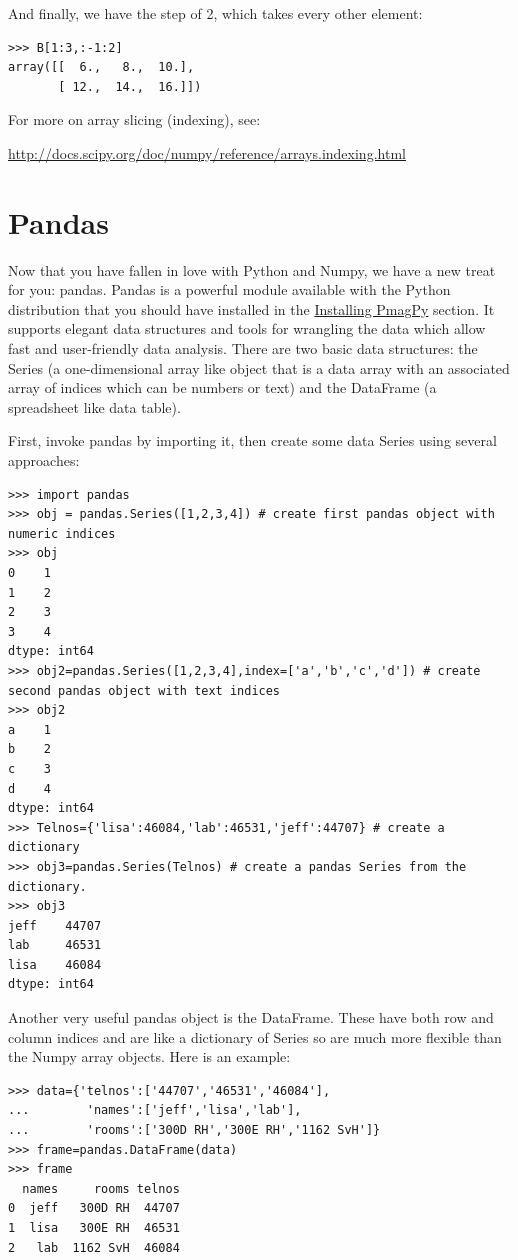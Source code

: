 \documentclass[11pt]{book}
\begin{document}
{{\noindent And finally, we have the step of 2, which takes every other element:

{ \color{blue} \begin{verbatim}
>>> B[1:3,:-1:2]
array([[  6.,   8.,  10.],
       [ 12.,  14.,  16.]])
\end{verbatim}}

\noindent For more on array slicing (indexing), see:

\url{http://docs.scipy.org/doc/numpy/reference/arrays.indexing.html}




\section{Pandas}

Now that you have fallen in love with Python and Numpy, we have a new treat for you:  pandas.  Pandas is a powerful module available with the Python distribution that you should have installed in the \href{#quick_start}{Installing PmagPy} section.  It supports elegant data structures and tools for wrangling the data which allow fast and user-friendly data analysis.  There are two basic data structures:  the Series (a one-dimensional array like object that is a data array with an associated array of indices which can be numbers or text) and the DataFrame (a spreadsheet like data table).

First, invoke pandas by importing it, then create some data Series using several approaches:

{ \color{blue} \begin{verbatim}
>>> import pandas
>>> obj = pandas.Series([1,2,3,4]) # create first pandas object with numeric indices
>>> obj
0    1
1    2
2    3
3    4
dtype: int64
>>> obj2=pandas.Series([1,2,3,4],index=['a','b','c','d']) # create second pandas object with text indices
>>> obj2
a    1
b    2
c    3
d    4
dtype: int64
>>> Telnos={'lisa':46084,'lab':46531,'jeff':44707} # create a dictionary
>>> obj3=pandas.Series(Telnos) # create a pandas Series from the dictionary.
>>> obj3
jeff    44707
lab     46531
lisa    46084
dtype: int64
\end{verbatim}}


Another very useful pandas object is the DataFrame.  These have both row and column indices and are like a dictionary of Series so are much more flexible than the Numpy array objects.   Here is an example:

{ \color{blue} \begin{verbatim}
>>> data={'telnos':['44707','46531','46084'],
...        'names':['jeff','lisa','lab'],
...        'rooms':['300D RH','300E RH','1162 SvH']}
>>> frame=pandas.DataFrame(data)
>>> frame
  names     rooms telnos
0  jeff   300D RH  44707
1  lisa   300E RH  46531
2   lab  1162 SvH  46084
 \end{verbatim}}

}}
\end{document}
